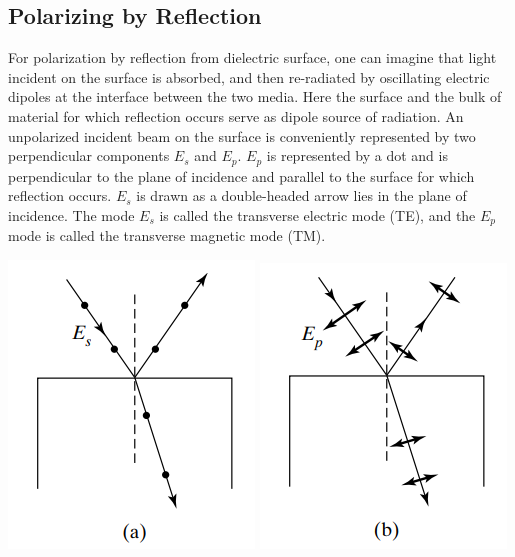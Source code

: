 \documentclass[11pt]{book}
\theoremstyle{break}
\theoremstyle{break}
\begin{document}
\subsection{Polarizing by Reflection}
For polarization by reflection from dielectric surface, one can imagine that light incident on the surface is absorbed, and then re-radiated by oscillating electric dipoles at the interface between the two media. Here the surface and the bulk of material for which reflection occurs serve as dipole source of radiation. An unpolarized incident beam on the surface is conveniently represented by two perpendicular components $E_s$ and $E_p$. $E_p$ is represented by a dot and is perpendicular to the plane of incidence and parallel to the surface for which reflection occurs. $E_s$ is drawn as a double-headed arrow lies in the plane of incidence. The mode $E_s$ is called the transverse electric mode (TE), and the $E_p$ mode is called the transverse magnetic mode (TM).
\begin{center}
\includegraphics[scale=0.80]{Ep.png}
\qquad\qquad
\includegraphics[scale=0.80]{Es.png}
\end{center}
\end{document}
